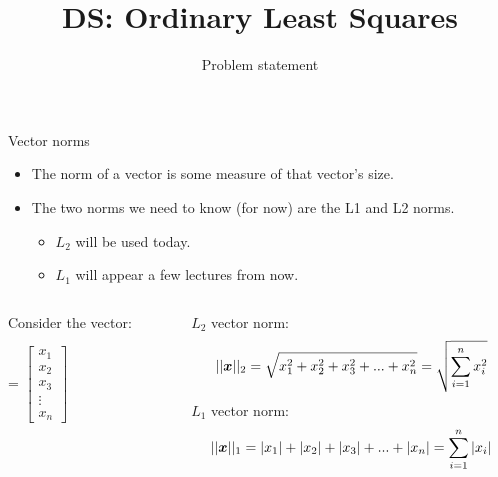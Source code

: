 \documentclass[aspectratio=169]{../latex_main/tntbeamer}  %
\title[Regression]{DS: Ordinary Least Squares}
\subtitle{Problem statement}
\begin{document}
	
	\maketitle
	\begin{frame}{Vector norms}
	    \begin{itemize}
	        \item The norm of a vector is some measure of that vector’s size.
	        \item  The two norms we need to know (for now) are the L1 and L2 norms.
	        \begin{itemize}
	            \item $L_2$ will be used today.
	            \item $L_1$ will appear a few lectures from now.
	        \end{itemize}
	    \end{itemize}
	    \begin{columns}
	        \begin{column}{.4\textwidth}
	        Consider the vector:

	                 = $\left[\begin{array}{c}
	          x_1\\
	          x_2 \\
	          x_3 \\
	          \vdots\\
	          x_n
	    \end{array}\right]$
	        \end{column}
	        
	        
	        
	         \begin{column}{.5\textwidth}
	                $L_2$ vector norm:
	                \begin{equation*}
	                    ||\bm{x}||_2 = \sqrt{x_1^2 + x_2^2 + x_3^2 + ... + x_n^2} = \sqrt{\sum\limits_{i=1}^nx_i^2}
	                \end{equation*}
	                $L_1$ vector norm:
	                \begin{equation*}
	                    ||\bm{x}||_1 = |x_1| + |x_2| + |x_3| + ... +|x_n| = \sum\limits_{i=1}^n|x_i| 
	                \end{equation*}
	        \end{column}
	    \end{columns}
	\end{frame}
	
\end{document}
